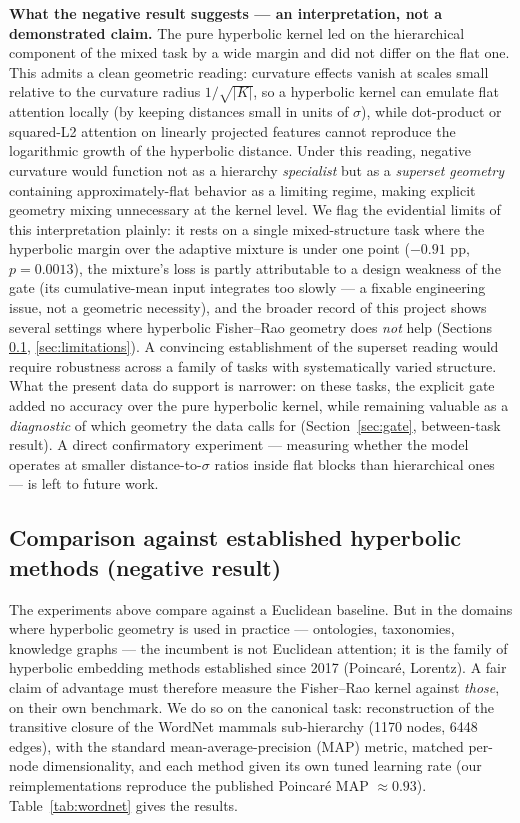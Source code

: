 \documentclass[11pt]{article}
\begin{document}
\textbf{What the negative result suggests --- an interpretation, not a demonstrated claim.} The pure hyperbolic kernel led on the hierarchical component of the mixed task by a wide margin and did not differ on the flat one. This admits a clean geometric reading: curvature effects vanish at scales small relative to the curvature radius $1/\sqrt{|K|}$, so a hyperbolic kernel can emulate flat attention locally (by keeping distances small in units of $\sigma$), while dot-product or squared-L2 attention on linearly projected features cannot reproduce the logarithmic growth of the hyperbolic distance. Under this reading, negative curvature would function not as a hierarchy \emph{specialist} but as a \emph{superset geometry} containing approximately-flat behavior as a limiting regime, making explicit geometry mixing unnecessary at the kernel level. We flag the evidential limits of this interpretation plainly: it rests on a single mixed-structure task where the hyperbolic margin over the adaptive mixture is under one point ($-0.91$ pp, $p=0.0013$), the mixture's loss is partly attributable to a design weakness of the gate (its cumulative-mean input integrates too slowly --- a fixable engineering issue, not a geometric necessity), and the broader record of this project shows several settings where hyperbolic Fisher--Rao geometry does \emph{not} help (Sections \ref{sec:incumbents}, \ref{sec:limitations}). A convincing establishment of the superset reading would require robustness across a family of tasks with systematically varied structure. What the present data do support is narrower: on these tasks, the explicit gate added no accuracy over the pure hyperbolic kernel, while remaining valuable as a \emph{diagnostic} of which geometry the data calls for (Section~\ref{sec:gate}, between-task result). A direct confirmatory experiment --- measuring whether the model operates at smaller distance-to-$\sigma$ ratios inside flat blocks than hierarchical ones --- is left to future work.

\subsection{Comparison against established hyperbolic methods (negative result)}\label{sec:incumbents}

The experiments above compare against a Euclidean baseline. But in the domains where hyperbolic geometry is used in practice --- ontologies, taxonomies, knowledge graphs --- the incumbent is not Euclidean attention; it is the family of hyperbolic embedding methods established since 2017 \cite{nickel2017} (Poincar\'e, Lorentz). A fair claim of advantage must therefore measure the Fisher--Rao kernel against \emph{those}, on their own benchmark. We do so on the canonical task: reconstruction of the transitive closure of the WordNet mammals sub-hierarchy (1170 nodes, 6448 edges), with the standard mean-average-precision (MAP) metric, matched per-node dimensionality, and each method given its own tuned learning rate (our reimplementations reproduce the published Poincar\'e MAP $\approx 0.93$). Table~\ref{tab:wordnet} gives the results.
\end{document}
